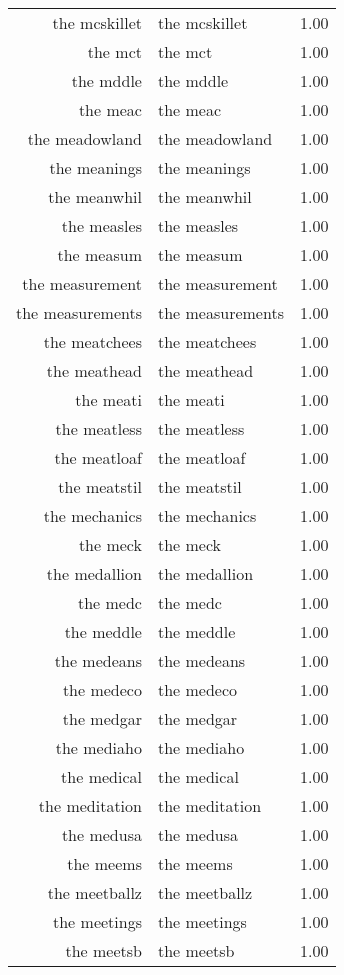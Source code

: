 \begin{table}[ht]
\begin{tabular}{rlr}
  the mcskillet & the mcskillet & 1.00 \\ 
  the mct & the mct & 1.00 \\ 
  the mddle & the mddle & 1.00 \\ 
  the meac & the meac & 1.00 \\ 
  the meadowland & the meadowland & 1.00 \\ 
  the meanings & the meanings & 1.00 \\ 
  the meanwhil & the meanwhil & 1.00 \\ 
  the measles & the measles & 1.00 \\ 
  the measum & the measum & 1.00 \\ 
  the measurement & the measurement & 1.00 \\ 
  the measurements & the measurements & 1.00 \\ 
  the meatchees & the meatchees & 1.00 \\ 
  the meathead & the meathead & 1.00 \\ 
  the meati & the meati & 1.00 \\ 
  the meatless & the meatless & 1.00 \\ 
  the meatloaf & the meatloaf & 1.00 \\ 
  the meatstil & the meatstil & 1.00 \\ 
  the mechanics & the mechanics & 1.00 \\ 
  the meck & the meck & 1.00 \\ 
  the medallion & the medallion & 1.00 \\ 
  the medc & the medc & 1.00 \\ 
  the meddle & the meddle & 1.00 \\ 
  the medeans & the medeans & 1.00 \\ 
  the medeco & the medeco & 1.00 \\ 
  the medgar & the medgar & 1.00 \\ 
  the mediaho & the mediaho & 1.00 \\ 
  the medical & the medical & 1.00 \\ 
  the meditation & the meditation & 1.00 \\ 
  the medusa & the medusa & 1.00 \\ 
  the meems & the meems & 1.00 \\ 
  the meetballz & the meetballz & 1.00 \\ 
  the meetings & the meetings & 1.00 \\ 
  the meetsb & the meetsb & 1.00 \\ 

\end{tabular}
\end{table}
